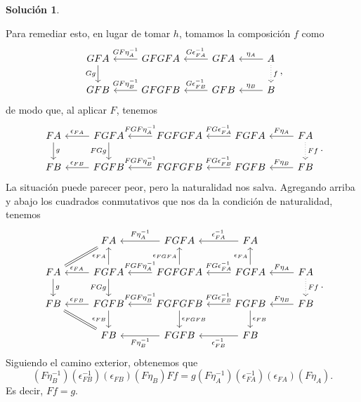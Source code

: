 \documentclass[12pt,letterpaper,titlepage]{article}
\theoremstyle{definition}
\newtheorem*{sol}{Solución}
\newcommand\<{\langle}
\renewcommand\>{\rangle}
\begin{document}
\begin{sol}
\begin{itemize}
        Para remediar esto, en lugar de tomar $h$, tomamos la composición
        $f$ como
        \[
        \begin{tikzcd}
            GFA \ar[d,"Gg"']
            & GFGFA \ar[l,"GF\eta_A^{-1}"']
            & GFA \ar[l,"G\epsilon_{FA}^{-1}"']
            & A \ar[l,"\eta_A"']
            \ar[d,"f",dotted]\\
            GFB
            & GFGFB \ar[l,"GF\eta_B^{-1}"']
            & GFB \ar[l,"G\epsilon_{FB}^{-1}"']
            & B \ar[l,"\eta_B"']
        \end{tikzcd}
        ,\]
        de modo que, al aplicar $F$, tenemos
        \[
        \begin{tikzcd}
            FA \ar[d,"g"]
            & FGFA \ar[d,"FGg"'] \ar[l,"\epsilon_{FA}"']
            & FGFGFA \ar[l,"FGF\eta_A^{-1}"']
            & FGFA \ar[l,"FG\epsilon_{FA}^{-1}"']
            & FA \ar[l,"F\eta_A"']
            \ar[d,"Ff",dotted]\\
            FB
            & FGFB \ar[l,"\epsilon_{FB}"']
            & FGFGFB \ar[l,"FGF\eta_B^{-1}"']
            & FGFB \ar[l,"FG\epsilon_{FB}^{-1}"']
            & FB \ar[l,"F\eta_B"']
        \end{tikzcd}
        .\]
        La situación puede parecer peor, pero la naturalidad nos salva.
        Agregando arriba y abajo los cuadrados conmutativos que nos
        da la condición de naturalidad, tenemos
        \[
        \begin{tikzcd}
            & FA \ar[equal,dl]
            & FGFA \ar[l,"F\eta_A^{-1}"']
            & FA \ar[l,"\epsilon_{FA}^{-1}"']
            \\
            FA \ar[d,"g"]
            & FGFA \ar[d,"FGg"'] \ar[u,"\epsilon_{FA}"]\ar[l,"\epsilon_{FA}"']
            & FGFGFA \ar[l,"FGF\eta_A^{-1}"'] \ar[u,"\epsilon_{FGFA}"]
            & FGFA \ar[l,"FG\epsilon_{FA}^{-1}"'] \ar[u,"\epsilon_{FA}"]
            & FA \ar[l,"F\eta_A"']
            \ar[d,"Ff",dotted]
            \\
            FB
            & FGFB \ar[l,"\epsilon_{FB}"']\ar[d,"\epsilon_{FB}"']
            & FGFGFB \ar[l,"FGF\eta_B^{-1}"'] \ar[d,"\epsilon_{FGFB}"]
            & FGFB \ar[l,"FG\epsilon_{FB}^{-1}"'] \ar[d,"\epsilon_{FB}"]
            & FB \ar[l,"F\eta_B"']
            \\
            & FB \ar[equal,ul]
            & FGFB \ar[l,"F\eta_B^{-1}"]
            & FB \ar[l,"\epsilon_{FB}^{-1}"]
        \end{tikzcd}
        .\]
        Siguiendo el camino exterior, obtenemos que
        \[
            (F\eta_B^{-1})(\epsilon_{FB}^{-1})(\epsilon_{FB})(F\eta_B)Ff
            = g(F\eta_A^{-1})(\epsilon_{FA}^{-1})(\epsilon_{FA})(F\eta_A)
        .\]
        Es decir, $Ff=g$.
        

\end{itemize}
\end{sol}
\end{document}
